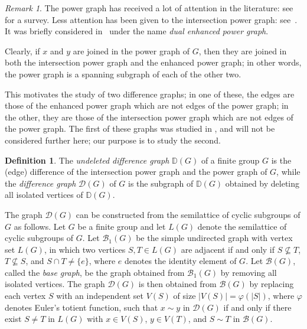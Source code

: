 \documentclass[12pt]{amsart}
\theoremstyle{plain}
\theoremstyle{remark}
\newtheorem{remark}[theorem]{Remark}
\theoremstyle{definition}
\newtheorem{defn}{Definition}[section]
\begin{document}
\begin{remark}
The power graph has received a lot of attention in the literature: see
\cite{powergraph} for a survey. Less attention has been given to the
intersection power graph: see~\cite{intersectionpwegraphb3}. It was briefly
considered in~\cite{gog} under the name \emph{dual enhanced power graph}.
 
Clearly, if $x$ and $y$ are joined in the power graph of $G$, then they are joined in both the intersection power graph and the enhanced power graph; in other
words, the power graph is a spanning subgraph of each of the other two.
\end{remark}

This motivates the study of two difference graphs; in one of these, the edges
are those of the enhanced power graph which are not edges of the power graph;
in the other, they are those of the intersection power graph which are not
edges of the power graph. The first of these graphs was studied in \cite{bcdd},
and will not be considered further here; our purpose is to study the second.

\begin{defn}\label{Def:dg}
The \emph{undeleted difference graph} $\mathbb{D}(G)$ of a finite group $G$ is the (edge) difference of the intersection power graph and the power graph of $G$, while the \emph{difference graph} $\mathcal{D}(G)$ of $G$ is the subgraph of $\mathbb{D}(G)$ obtained by deleting all isolated vertices of $\mathbb{D}(G)$.  
\end{defn}


The graph $\mathcal{D}(G)$ can be constructed from the semilattice of cyclic subgroups of $G$ as follows.
Let $G$ be a finite group and let $L(G)$ denote the semilattice of cyclic subgroups of $G$. Let $\mathcal{B}_1(G)$ be the simple undirected graph with vertex set $L(G)$, in which two vertices $S, T \in L(G)$ are adjacent if and only if $S \not\subseteq T$, $T \not\subseteq S$, and $S \cap T \neq \{e\}$, where $e$ denotes the identity element of $G$. Let $\mathcal{B}(G)$, called the \emph{base graph}, be the graph obtained from $\mathcal{B}_1(G)$ by removing all isolated vertices. The graph $\mathcal{D}(G)$ is then obtained from $\mathcal{B}(G)$ by replacing each vertex $S$ with an independent set $V(S)$ of size $|V(S)| = \varphi(|S|)$, where $\varphi$ denotes Euler's totient function, such that $x \sim y$ in $\mathcal{D}(G)$ if and only if there exist $S \neq T$ in $L(G)$ with $x \in V(S)$, $y \in V(T)$, and $S \sim T$ in $\mathcal{B}(G)$.
\end{document}
